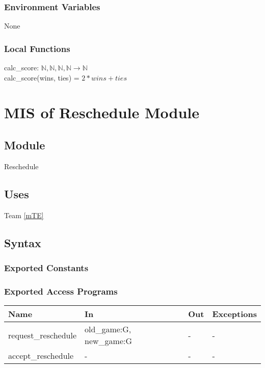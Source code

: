 \documentclass[12pt, titlepage]{article}
\begin{document}
\subsubsection{Environment Variables}

None

\subsubsection{Local Functions}

calc\_score: $\mathbb{N}, \mathbb{N}, \mathbb{N}, \mathbb{N} \rightarrow \mathbb{N}$\\
calc\_score(wins, ties) = $2*wins + ties$

\newpage

\section{MIS of Reschedule Module} \label{mRE}

\subsection{Module}

Reschedule

\subsection{Uses}

Team \ref{mTE}

\subsection{Syntax}

\subsubsection{Exported Constants}

\subsubsection{Exported Access Programs}

\begin{center}
\begin{tabular}{p{5cm} p{4cm} p{4cm} p{2cm}}
\hline
\textbf{Name} & \textbf{In} & \textbf{Out} & \textbf{Exceptions} \\
\hline
request\_reschedule & old\_game:G, new\_game:G & - & - \\
accept\_reschedule & - & - & - \\
\hline
\end{tabular}
\end{center}
\end{document}
